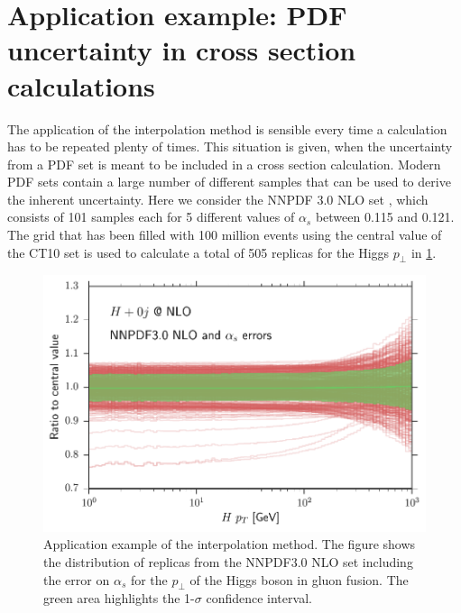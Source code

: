 \section{Application example: PDF uncertainty in cross section calculations}
The application of the interpolation method is sensible every time a calculation has to be repeated plenty of times.
This situation is given, when the uncertainty from a PDF set is meant to be included in a cross section calculation.
Modern PDF sets contain a large number of different samples that can be used to derive the inherent uncertainty.
Here we consider the NNPDF 3.0 NLO set \cite{nnpdf30}, which consists of \num{101} samples each for \num{5} different values of $\alpha_s$ between \num{0.115} and \num{0.121}.
The grid that has been filled with 100 million events using the central value of the CT10 set is used to calculate a total of 505 replicas for the Higgs $p_\perp$ in \cref{fig:nnpdf_band}.
%
\begin{figure}
	\centering
	\includegraphics[width=\textwidth]{images/nnpdf_band.pdf}
	\caption{Application example of the interpolation method.
				The figure shows the distribution of replicas from the NNPDF3.0 NLO set including the error on $\alpha_s$ for the $p_\perp$ of the Higgs boson in gluon fusion.
				The green area highlights the 1-$\sigma$ confidence interval.}
	\label{fig:nnpdf_band}
\end{figure}
%
